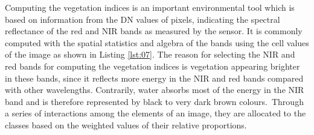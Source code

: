 \documentclass[jimaging,article,accept,pdftex,moreauthors]{Definitions/mdpi}
\begin{document}
Computing the vegetation indices is an important environmental tool which is based on information from {the DN values of pixels}, indicating the spectral reflectance of the red and NIR bands as measured by the sensor. It is commonly computed with the spatial statistics and algebra of the bands using the cell values {of the image} as {shown} in Listing \ref{lst:07}. The reason for selecting the NIR and red bands for computing the vegetation indices is vegetation appearing brighter in these bands, since it reflects more energy in the NIR and red bands compared {with} other wavelengths. Contrarily, water absorbs most of the energy in the NIR band and is {therefore} represented by black to very dark brown colours.~Through a series of interactions among the{ }elements{ of an image}, they are allocated to the classes based on the weighted values of their relative proportions.
\end{document}
